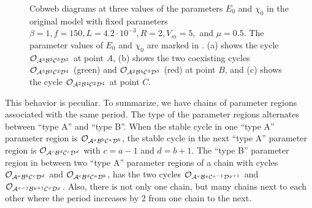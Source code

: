 \begin{figure}
	\centering
	\caption[Cobweb diagrams of the original model]{
		Cobweb diagrams at three values of the parameters $E_0$ and $\chi_0$ in the original model with fixed parameters $\beta = 1, f = 150, L = 4.2 \cdot 10^{-3}, R = 2, V_m = 5,$ and $\mu = 0.5$.
		The parameter values of $E_0$ and $\chi_0$ are marked in .
		(a) shows the cycle $\mathcal{O}_{\mathcal{A}^3\mathcal{B}^3\mathcal{C}^3\mathcal{D}^3}$ at point $A$,
		(b) shows the two coexisting cycles $\mathcal{O}_{\mathcal{A}^3\mathcal{B}^3\mathcal{C}^2\mathcal{D}^4}$ (green) and $\mathcal{O}_{\mathcal{A}^2\mathcal{B}^4\mathcal{C}^3\mathcal{D}^3}$ (red) at point $B$,
		and (c) shows the cycle $\mathcal{O}_{\mathcal{A}^2\mathcal{B}^4\mathcal{C}^2\mathcal{D}^4}$ at point $C$.
	}
	\label{fig:state.og.dynamics.cobwebs}
\end{figure}

This behavior is peculiar.
To summarize, we have chains of parameter regions associated with the same period.
The type of the parameter regions alternates between ``type A'' and ``type B''.
When the stable cycle in one ``type A'' parameter region is $\mathcal{O}_{\mathcal{A}^a\mathcal{B}^b\mathcal{C}^a\mathcal{D}^b}$, the stable cycle in the next ``type A'' parameter region is $\mathcal{O}_{\mathcal{A}^{c}\mathcal{B}^{d}\mathcal{C}^{c}\mathcal{D}^{d}}$ with $c = a - 1$ and $d = b + 1$.
The ``type B'' parameter region in between two ``type A'' parameter regions of a chain with cycles $\mathcal{O}_{\mathcal{A}^a\mathcal{B}^b\mathcal{C}^c\mathcal{D}^d}$ and $\mathcal{O}_{\mathcal{A}^{c}\mathcal{B}^{d}\mathcal{C}^{a}\mathcal{D}^{b}}$, has the two cycles $\mathcal{O}_{\mathcal{A}^x\mathcal{B}^y\mathcal{C}^{x-1}\mathcal{D}^{y+1}}$ and $\mathcal{O}_{\mathcal{A}^{x-1}\mathcal{B}^{y+1}\mathcal{C}^x\mathcal{D}^y}$.
Also, there is not only one chain, but many chains next to each other where the period increases by 2 from one chain to the next.
